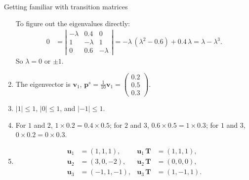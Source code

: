 \documentclass[12pt]{article}
\begin{document}
\begin{problem}{Getting familiar with transition matrices}
\begin{enumerate}
    To figure out the eigenvalues directly:
    $$
    \begin{aligned}
    0
    &=
    \left|
      \begin{array}{ccc}
      -\lambda  &   0.4   &   0  \\
      1         & -\lambda  &   1  \\
      0         &   0.6   &   -\lambda
      \end{array}
    \right|
    =
    -\lambda \, (\lambda^2 - 0.6) + 0.4 \, \lambda
    =
    \lambda - \lambda^3
    .
    \end{aligned}
    $$
    So $\lambda = 0$ or $\pm 1$.

  \item
    The eigenvector is $\mathbf v_1$,
    $
      \mathbf p^s
      =
      \frac{1}{10} \mathbf v_1
      =
      \left(
        \begin{array}{r}
          0.2 \\
          0.5 \\
          0.3
        \end{array}
      \right)
      .
    $

  \item
    $|1| \le 1$, $|0| \le 1$, and $|-1| \le 1$.

  \item
    For $1$ and $2$, $1 \times 0.2 = 0.4 \times 0.5$;
    for $2$ and $3$, $0.6 \times 0.5 = 1 \times 0.3$;
    for $1$ and $3$, $0 \times 0.2 = 0 \times 0.3$.

  \item
    $$
    \begin{aligned}
      \mathbf u_1 &= (1, 1, 1),
      &
      \mathbf u_1 \, \mathbf T &= (1, 1, 1)
      , \\
      \mathbf u_2 &= (3, 0, -2),
      &
      \mathbf u_2 \, \mathbf T &= (0, 0, 0)
      , \\
      \mathbf u_3 &= (-1, 1, -1),
      &
      \mathbf u_3 \, \mathbf T &= (1, -1, 1)
      .
    \end{aligned}
    $$
\end{enumerate}
\end{problem}
\end{document}

